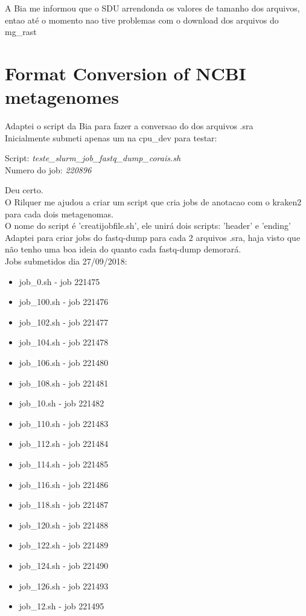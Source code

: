 \documentclass[12pt, a4paper]{report}
\begin{document}
A Bia me informou que o SDU arrendonda os valores de tamanho dos arquivos, entao até o momento nao
tive problemas com o download dos arquivos do mg\_rast

\chapter{Format Conversion of NCBI metagenomes}
 
Adaptei o script da Bia para fazer a conversao do dos arquivos .sra\\
Inicialmente submeti apenas um na cpu\_dev para testar:\\ 

\begin{tcolorbox}[width=5.3in]
 \scriptsize 
\normalsize  Script: \textit{teste\_slurm\_job\_fastq\_dump\_corais.sh}\\
\normalsize  Numero do job: \textit{220896}
 \end{tcolorbox}

Deu certo. \\
O Rilquer me ajudou a criar um script que cria jobs de anotacao com o kraken2 para cada dois metagenomas. \\
O nome do script é 'creatijobfile.sh', ele unirá dois scripts: 'header' e 'ending' \\
Adaptei para criar jobs do fastq-dump para cada 2 arquivos .sra, haja visto que não tenho uma boa ideia do quanto cada fastq-dump demorará. \\

Jobs submetidos dia 27/09/2018:
\begin{itemize}
\item job\_0.sh - job 221475
\item job\_100.sh - job 221476
\item job\_102.sh - job 221477
\item job\_104.sh - job 221478
\item job\_106.sh - job 221480
\item job\_108.sh - job 221481
\item job\_10.sh - job 221482
\item job\_110.sh - job 221483
\item job\_112.sh - job 221484
\item job\_114.sh - job 221485
\item job\_116.sh - job 221486
\item job\_118.sh - job 221487
\item job\_120.sh - job 221488
\item job\_122.sh - job 221489
\item job\_124.sh - job 221490
\item job\_126.sh - job 221493
\item job\_12.sh - job 221495
\end{itemize}
\end{document}
